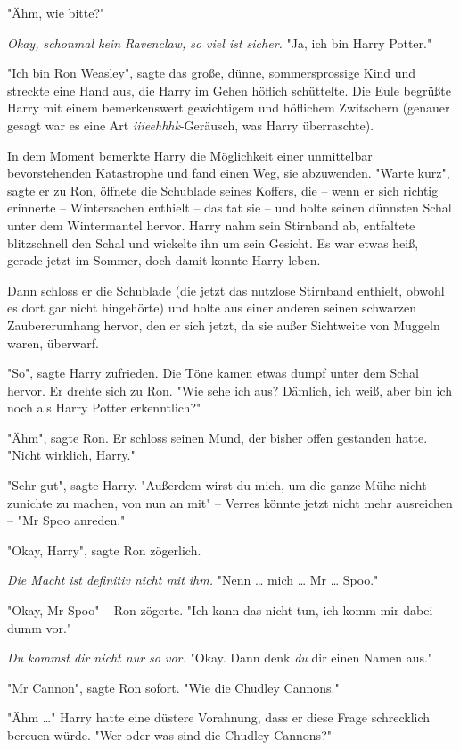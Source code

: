 {"Ähm, wie bitte?"

\emph{Okay, schonmal kein Ravenclaw, so viel ist sicher.} "Ja, ich bin Harry Potter."

"Ich bin Ron Weasley", sagte das große, dünne, sommersprossige Kind und streckte eine Hand aus, die Harry im Gehen höflich schüttelte. Die Eule begrüßte Harry mit einem bemerkenswert gewichtigem und höflichem Zwitschern (genauer gesagt war es eine Art \emph{iiieehhhk}-Geräusch, was Harry überraschte).

In dem Moment bemerkte Harry die Möglichkeit einer unmittelbar bevorstehenden Katastrophe und fand einen Weg, sie abzuwenden. "Warte kurz", sagte er zu Ron, öffnete die Schublade seines Koffers, die -- wenn er sich richtig erinnerte -- Wintersachen enthielt -- das tat sie -- und holte seinen dünnsten Schal unter dem Wintermantel hervor. Harry nahm sein Stirnband ab, entfaltete blitzschnell den Schal und wickelte ihn um sein Gesicht. Es war etwas heiß, gerade jetzt im Sommer, doch damit konnte Harry leben.

Dann schloss er die Schublade (die jetzt das nutzlose Stirnband enthielt, obwohl es dort gar nicht hingehörte) und holte aus einer anderen seinen schwarzen Zaubererumhang hervor, den er sich jetzt, da sie außer Sichtweite von Muggeln waren, überwarf.

"So", sagte Harry zufrieden. Die Töne kamen etwas dumpf unter dem Schal hervor. Er drehte sich zu Ron. "Wie sehe ich aus? Dämlich, ich weiß, aber bin ich noch als Harry Potter erkenntlich?"

"Ähm", sagte Ron. Er schloss seinen Mund, der bisher offen gestanden hatte. "Nicht wirklich, Harry."

"Sehr gut", sagte Harry. "Außerdem wirst du mich, um die ganze Mühe nicht zunichte zu machen, von nun an mit" -- Verres könnte jetzt nicht mehr ausreichen -- "Mr Spoo anreden."

"Okay, Harry", sagte Ron zögerlich.

\emph{Die Macht ist definitiv nicht mit ihm.} "Nenn … mich … Mr … Spoo."

"Okay, Mr Spoo" -- Ron zögerte. "Ich kann das nicht tun, ich komm mir dabei dumm vor."

\emph{Du kommst dir nicht nur so vor.} "Okay. Dann denk \emph{du} dir einen Namen aus."

"Mr Cannon", sagte Ron sofort. "Wie die Chudley Cannons."

"Ähm …" Harry hatte eine düstere Vorahnung, dass er diese Frage schrecklich bereuen würde. "Wer oder was sind die Chudley Cannons?"

}
